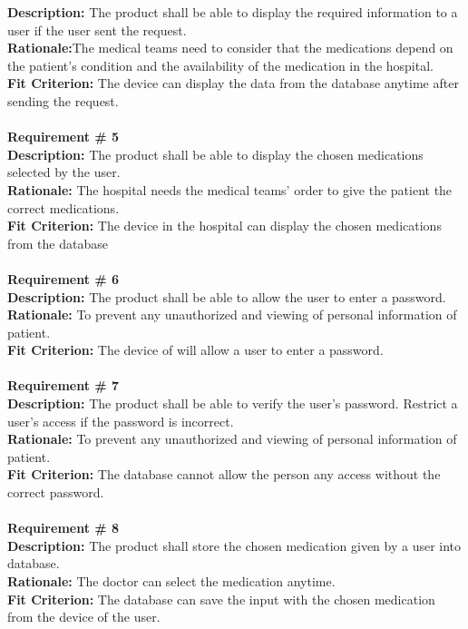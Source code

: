 \documentclass[12pt]{article}
\begin{document}
{\bf Description:} The product shall be able to display the required information to a user if the user sent the request.\\
{\bf Rationale:}The medical teams need to consider that the medications depend on the patient's condition and the availability of the medication in the hospital.\\
{\bf Fit Criterion:} The device can display the data from the database anytime after sending the request. \\ \\
{\bf Requirement \# 5}\\
{\bf Description:} The product shall be able to display the chosen medications selected by the user.\\
{\bf Rationale:} The hospital needs the medical teams’ order to give the patient the correct medications.\\
{\bf Fit Criterion:}  The device in the hospital can display the chosen medications from the database \\ \\
{\bf Requirement \# 6}\\
{\bf Description:} The product shall be able to allow the user to enter a password.  \\
{\bf Rationale:} To prevent any unauthorized and viewing of personal information of patient. \\
{\bf Fit Criterion:} The device of will allow a user to enter a password.\\ \\
{\bf Requirement \# 7}\\
{\bf Description:} The product shall be able to verify the user’s password. Restrict a user’s access if the password is incorrect.\\
{\bf Rationale:} To prevent any unauthorized and viewing of personal information of patient.\\
{\bf Fit Criterion:} The database cannot allow the person any access without the correct password.\\ \\
{\bf Requirement \# 8}\\
{\bf Description:} The product shall store the chosen medication given by a user into database.  \\
{\bf Rationale:} The doctor can select the medication anytime.\\
{\bf Fit Criterion:} The database can save the input with the chosen medication from the device of the user.
\end{document}
